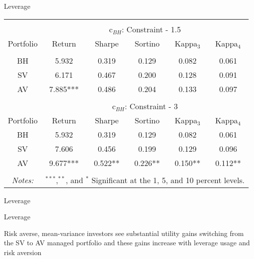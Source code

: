 \documentclass[handout]{beamer}
\begin{document}
\begin{frame}{Leverage}
	\begin{adjustbox}{width=\textwidth}
		\begin{tabular}{@{\extracolsep{5pt}} cccccc} 
			\hline \\[-1.8ex] 
			& \multicolumn{5}{c}{c$_{BH}$: Constraint - 1.5}\\
			\cline{2-6}
			Portfolio & Return & Sharpe & Sortino & Kappa$_{3}$ & Kappa$_{4}$\\ 
			\hline \\[-1.8ex] 
			BH & 5.932 & 0.319 & 0.129 & 0.082 & 0.061 \\ 
			SV & 6.171 & 0.467 & 0.200 & 0.128 & 0.091 \\ 
			AV & 7.885*** & 0.486 & 0.204 & 0.133 & 0.097 \\ 
			\hline\\
			& \multicolumn{5}{c}{c$_{BH}$: Constraint - 3}\\
			\cline{2-6}
			Portfolio & Return & Sharpe & Sortino & Kappa$_{3}$ & Kappa$_{4}$\\ 
			BH & 5.932 & 0.319 & 0.129 & 0.082 & 0.061\\
			SV & 7.606 & 0.456 & 0.199 & 0.129 & 0.096\\
			AV & 9.677*** & 0.522** & 0.226** & 0.150** & 0.112**\\
			\hline\\
			\textit{Notes:} & \multicolumn{5}{r}{$^{***}$,$^{**}$, and $^{*}$ Significant at the 1, 5, and 10 percent levels.}
		\end{tabular}
	\end{adjustbox}
\end{frame}

\begin{frame}{Leverage}
	\begin{adjustbox}{width=\textwidth}
		
	\end{adjustbox}
\end{frame}

\begin{frame}{Leverage}
	\begin{adjustbox}{width=\textwidth}
		
	\end{adjustbox}
	Risk averse, mean-variance investors see substantial utility gains switching from the SV to AV managed portfolio and these gains increase with leverage usage and risk aversion
\end{frame}
\end{document}
